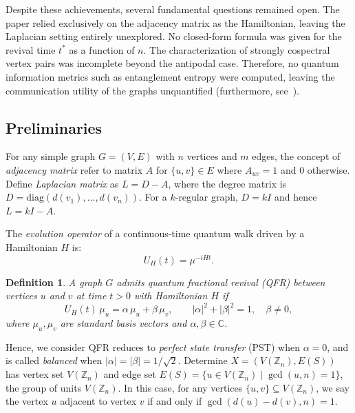 \documentclass[12pt]{amsart}
\newtheorem{definition}{Definition}
\begin{document}
Despite these achievements, several fundamental questions remained open. The paper relied
exclusively on the adjacency matrix as the Hamiltonian, leaving the Laplacian setting
entirely unexplored. No closed-form formula was given for the revival time $t^*$ as a function
of $n$. The characterization of strongly cospectral vertex pairs was incomplete beyond the
antipodal case. Therefore, no quantum information metrics such as entanglement entropy were
computed, leaving the communication utility of the graphs unquantified (furthermore, see~\cite{nielsen2000, saxena2007, so2006}).


\subsection{Preliminaries}
For any simple graph $G = (V, E)$ with $n$ vertices and $m$ edges, the concept of \emph{adjacency matrix} refer to matrix $A$ for $\{u,v\} \in E$ where $A_{uv} = 1$  and $0$ otherwise. Define \emph{Laplacian matrix} as
$L = D - A$, where the degree matrix is $D = \mathrm{diag}(d(v_1), \ldots, d(v_n))$.   
For a $k$-regular graph, $D = kI$ and hence $L = kI - A$.

The \emph{evolution operator} of a continuous-time quantum walk driven by a Hamiltonian $H$
is:
\begin{equation}\label{eq:evolution}
  U_H(t) =\mu^{-iHt}.
\end{equation}

\begin{definition}\label{def:qfr}
  A graph $G$ admits \emph{quantum fractional revival} (QFR) between vertices $u$ and $v$ at
  time $t > 0$ with Hamiltonian $H$ if
  \begin{equation}\label{eq:qfr_def}
    U_H(t)\, \mu_u = \alpha\, \mu_u + \beta\, \mu_v,
    \qquad |\alpha|^2 + |\beta|^2 = 1,\quad \beta \neq 0,
  \end{equation}
  where $\mu_u, \mu_v$ are standard basis vectors and $\alpha, \beta \in \mathbb{C}$. 
\end{definition}
Hence, we consider
  QFR reduces to \emph{perfect state transfer} (PST) when $\alpha = 0$, and is called
  \emph{balanced} when $|\alpha| = |\beta| = 1/\sqrt{2}$. Determine $X = (V(\mathbb{Z}_n), E(S))$ has vertex set $V(\mathbb{Z}_n)$ and
edge set $E(S)= \{u \in V(\mathbb{Z}_n) \mid  \gcd(u, n) = 1\}$, the group of units $V(\mathbb{Z}_n)$. In this case, for any vertices $\{u,v\}\subseteq V(\mathbb{Z}_n)$, we say the vertex $u$ adjacent to vertex $v$ if and only if $\gcd(d(u)-d(v), n)=1$.
\end{document}
